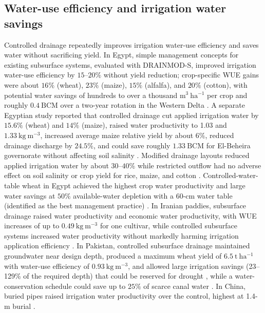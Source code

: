 \subsection{Water-use efficiency and irrigation water savings}

Controlled drainage repeatedly improves irrigation water-use efficiency and saves water without sacrificing yield. In Egypt, simple management concepts for existing subsurface systems, evaluated with DRAINMOD-S, improved irrigation water-use efficiency by \(15\textrm{--}20\%\) without yield reduction; crop-specific WUE gains were about \(16\%\) (wheat), \(23\%\) (maize), \(15\%\) (alfalfa), and \(20\%\) (cotton), with potential water savings of hundreds to over a thousand \(\mathrm{m^{3}\ ha^{-1}}\) per crop and roughly \(0.4\ \mathrm{BCM}\) over a two-year rotation in the Western Delta \parencite{Wahba2005}. A separate Egyptian study reported that controlled drainage cut applied irrigation water by \(15.6\%\) (wheat) and \(14\%\) (maize), raised water productivity to 1.03 and \(1.33\ \mathrm{kg\ m^{-3}}\), increased average maize relative yield by about \(6\%\), reduced drainage discharge by \(24.5\%\), and could save roughly \(1.33\ \mathrm{BCM}\) for El-Beheira governorate without affecting soil salinity \parencite{Mahmoud2021}. Modified drainage layouts reduced applied irrigation water by about \(30\textrm{--}40\%\) while restricted outflow had no adverse effect on soil salinity or crop yield for rice, maize, and cotton \parencite{ELATFY1991}. Controlled-water-table wheat in Egypt achieved the highest crop water productivity and large water savings at \(50\%\) available-water depletion with a 60-cm water table (identified as the best management practice) \parencite{ElHassanin2022}. In Iranian paddies, subsurface drainage raised water productivity and economic water productivity, with WUE increases of up to \(0.49\ \mathrm{kg\ m^{-3}}\) for one cultivar, while controlled subsurface systems increased water productivity without markedly harming irrigation application efficiency \parencite{DarziNaftchali2017b,Asgari2021}. In Pakistan, controlled subsurface drainage maintained groundwater near design depth, produced a maximum wheat yield of \(6.5\ \mathrm{t\ ha^{-1}}\) with water-use efficiency of \(0.93\ \mathrm{kg\ m^{-3}}\), and allowed large irrigation savings (23--129\% of the required depth) that could be reserved for drought \parencite{Khan2003}, while a water-conservation schedule could save up to \(25\%\) of scarce canal water \parencite{Sarwar2001}. In China, buried pipes raised irrigation water productivity over the control, highest at 1.4-m burial \parencite{Liu2025}.

